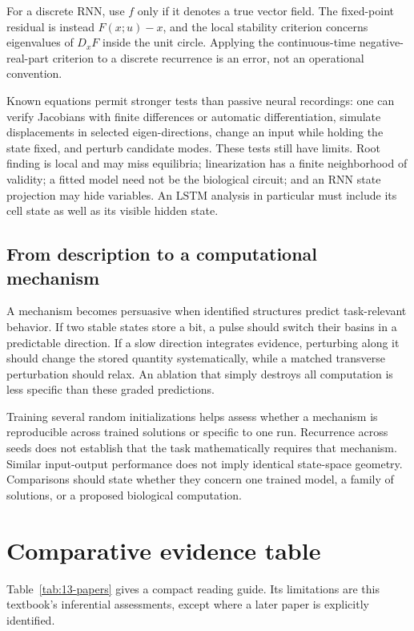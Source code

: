 For a discrete RNN, use \(f\) only if it denotes a true vector field. The fixed-point residual is instead \(F(x;u)-x\), and the local stability criterion concerns eigenvalues of \(D_xF\) inside the unit circle. Applying the continuous-time negative-real-part criterion to a discrete recurrence is an error, not an operational convention.

Known equations permit stronger tests than passive neural recordings: one can verify Jacobians with finite differences or automatic differentiation, simulate displacements in selected eigen-directions, change an input while holding the state fixed, and perturb candidate modes. These tests still have limits. Root finding is local and may miss equilibria; linearization has a finite neighborhood of validity; a fitted model need not be the biological circuit; and an RNN state projection may hide variables. An LSTM analysis in particular must include its cell state as well as its visible hidden state.

\subsection{From description to a computational mechanism}
A mechanism becomes persuasive when identified structures predict task-relevant behavior. If two stable states store a bit, a pulse should switch their basins in a predictable direction. If a slow direction integrates evidence, perturbing along it should change the stored quantity systematically, while a matched transverse perturbation should relax. An ablation that simply destroys all computation is less specific than these graded predictions.

Training several random initializations helps assess whether a mechanism is reproducible across trained solutions or specific to one run. Recurrence across seeds does not establish that the task mathematically requires that mechanism. Similar input-output performance does not imply identical state-space geometry. Comparisons should state whether they concern one trained model, a family of solutions, or a proposed biological computation.

\section{Comparative evidence table}
Table~\ref{tab:13-papers} gives a compact reading guide. Its limitations are this textbook's inferential assessments, except where a later paper is explicitly identified.

